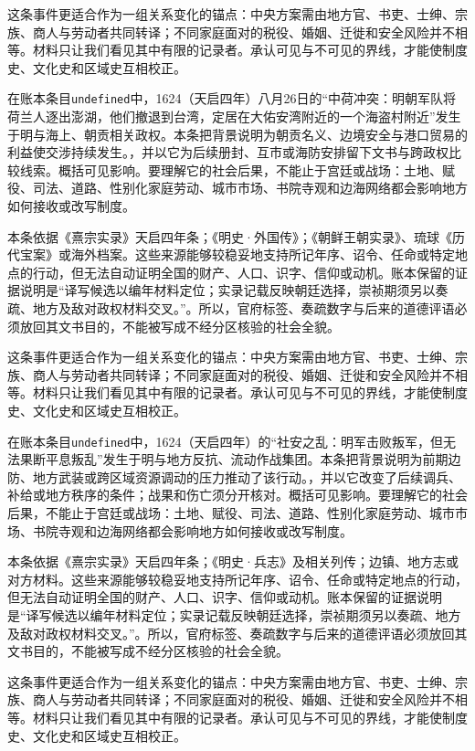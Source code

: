 这条事件更适合作为一组关系变化的锚点：中央方案需由地方官、书吏、士绅、宗族、商人与劳动者共同转译；不同家庭面对的税役、婚姻、迁徙和安全风险并不相等。材料只让我们看见其中有限的记录者。承认可见与不可见的界线，才能使制度史、文化史和区域史互相校正。

在账本条目\texttt{undefined}中，1624（天启四年）八月26日的“中荷冲突：明朝军队将荷兰人逐出澎湖，他们撤退到台湾，定居在大佑安湾附近的一个海盗村附近”发生于明与海上、朝贡相关政权。本条把背景说明为朝贡名义、边境安全与港口贸易的利益使交涉持续发生。，并以它为后续册封、互市或海防安排留下文书与跨政权比较线索。概括可见影响。要理解它的社会后果，不能止于宫廷或战场：土地、赋役、司法、道路、性别化家庭劳动、城市市场、书院寺观和边海网络都会影响地方如何接收或改写制度。

本条依据《熹宗实录》天启四年条；《明史·外国传》；《朝鲜王朝实录》、琉球《历代宝案》或海外档案。这些来源能够较稳妥地支持所记年序、诏令、任命或特定地点的行动，但无法自动证明全国的财产、人口、识字、信仰或动机。账本保留的证据说明是“译写候选以编年材料定位；实录记载反映朝廷选择，崇祯期须另以奏疏、地方及敌对政权材料交叉。”。所以，官府标签、奏疏数字与后来的道德评语必须放回其文书目的，不能被写成不经分区核验的社会全貌。

这条事件更适合作为一组关系变化的锚点：中央方案需由地方官、书吏、士绅、宗族、商人与劳动者共同转译；不同家庭面对的税役、婚姻、迁徙和安全风险并不相等。材料只让我们看见其中有限的记录者。承认可见与不可见的界线，才能使制度史、文化史和区域史互相校正。

在账本条目\texttt{undefined}中，1624（天启四年）的“社安之乱：明军击败叛军，但无法果断平息叛乱”发生于明与地方反抗、流动作战集团。本条把背景说明为前期边防、地方武装或跨区域资源调动的压力推动了该行动。，并以它改变了后续调兵、补给或地方秩序的条件；战果和伤亡须分开核对。概括可见影响。要理解它的社会后果，不能止于宫廷或战场：土地、赋役、司法、道路、性别化家庭劳动、城市市场、书院寺观和边海网络都会影响地方如何接收或改写制度。

本条依据《熹宗实录》天启四年条；《明史·兵志》及相关列传；边镇、地方志或对方材料。这些来源能够较稳妥地支持所记年序、诏令、任命或特定地点的行动，但无法自动证明全国的财产、人口、识字、信仰或动机。账本保留的证据说明是“译写候选以编年材料定位；实录记载反映朝廷选择，崇祯期须另以奏疏、地方及敌对政权材料交叉。”。所以，官府标签、奏疏数字与后来的道德评语必须放回其文书目的，不能被写成不经分区核验的社会全貌。

这条事件更适合作为一组关系变化的锚点：中央方案需由地方官、书吏、士绅、宗族、商人与劳动者共同转译；不同家庭面对的税役、婚姻、迁徙和安全风险并不相等。材料只让我们看见其中有限的记录者。承认可见与不可见的界线，才能使制度史、文化史和区域史互相校正。

